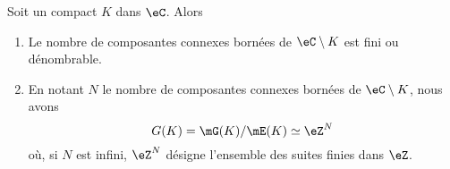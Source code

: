 \begin{theorem}		\label{THOooDGXSooMMHTds}
	Soit un compact \( K\) dans \( \eC\). Alors
	\begin{enumerate}
		\item
		      Le nombre de composantes connexes bornées de \( \eC\setminus K\) est fini ou dénombrable.
		\item
		      En notant \( N\) le nombre de composantes connexes bornées de \( \eC\setminus K\), nous avons
		      \begin{equation}
			      G(K)=\mG(K)/\mE(K)\simeq \eZ^N
		      \end{equation}
		      où, si \( N\) est infini, \( \eZ^N\) désigne l'ensemble des suites finies dans \( \eZ\).
	\end{enumerate}
\end{theorem}

